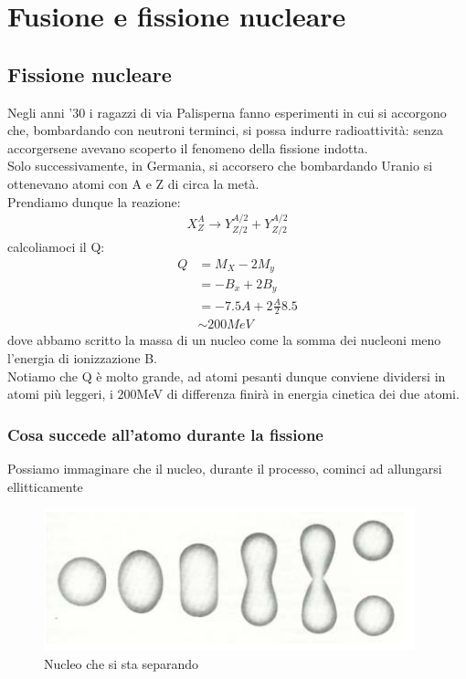 \chapter{Fusione e fissione nucleare}
\section{Fissione nucleare}
Negli anni '30 i ragazzi di via Palisperna fanno esperimenti in cui si accorgono che, bombardando con 
neutroni terminci, si possa indurre radioattività: senza accorgersene avevano scoperto il 
fenomeno della fissione indotta.\\
Solo successivamente, in Germania, si accorsero che bombardando Uranio si ottenevano atomi
con A e Z di circa la metà.\\
Prendiamo dunque la reazione:
\begin{align*}
    X^{A}_{Z} \rightarrow Y^{A/2}_{Z/2} + Y^{A/2}_{Z/2}
\end{align*}
calcoliamoci il Q:
\begin{align*}
        Q &= M_{X}-2M_{y}\\
          &= -B_{x}+2B_{y}\\
          &=-7.5A + 2\frac{A}{2}8.5\\
          &\sim 200MeV \tag*{Per atomi pesanti}
\end{align*}
dove abbamo scritto la massa di un nucleo come la somma dei nucleoni meno l'energia di ionizzazione B.\\
Notiamo che Q è molto grande, ad atomi pesanti dunque conviene dividersi in atomi più leggeri,
i 200MeV di differenza finirà in energia cinetica dei due atomi.
\subsection{Cosa succede all'atomo durante la fissione}
Possiamo immaginare che il nucleo, durante il processo, cominci ad allungarsi ellitticamente
\newpage
\begin{figure}[!h]
    \centering
    \includegraphics[scale=0.5]{ch6InterazioneMateria/NucleoFissione}
    \caption{Nucleo che si sta separando}
\end{figure}

